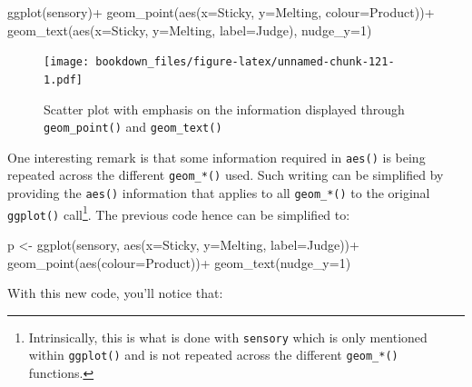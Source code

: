 \documentclass[
]{krantz}
\makeatletter
\newenvironment{Shaded}{\begin{snugshade}}{\end{snugshade}}
\newcommand{\AttributeTok}[1]{\textcolor[rgb]{0.61,0.61,0.61}{#1}}
\newcommand{\DecValTok}[1]{\textcolor[rgb]{0.06,0.06,0.06}{#1}}
\newcommand{\FunctionTok}[1]{\textcolor[rgb]{0,0,0}{#1}}
\newcommand{\NormalTok}[1]{#1}
\newcommand{\OtherTok}[1]{\textcolor[rgb]{0.37,0.37,0.37}{#1}}
\newcommand{\SpecialCharTok}[1]{\textcolor[rgb]{0,0,0}{#1}}
\newenvironment{kframe}{%
\medskip{}
\setlength{\fboxsep}{.8em}
 \def\at@end@of@kframe{}%
 \ifinner\ifhmode%
  \def\at@end@of@kframe{\end{minipage}}%
  \begin{minipage}{\columnwidth}%
 \fi\fi%
 \def\FrameCommand##1{\hskip\@totalleftmargin \hskip-\fboxsep
 \colorbox{shadecolor}{##1}\hskip-\fboxsep
     \hskip-\linewidth \hskip-\@totalleftmargin \hskip\columnwidth}%
 \MakeFramed {\advance\hsize-\width
   \@totalleftmargin\z@ \linewidth\hsize
   \@setminipage}}%
 {\par\unskip\endMakeFramed%
 \at@end@of@kframe}
\renewenvironment{Shaded}{\begin{kframe}}{\end{kframe}}
\makeatother
\begin{document}
\begin{Shaded}
\begin{Highlighting}[]
\FunctionTok{ggplot}\NormalTok{(sensory)}\SpecialCharTok{+}
  \FunctionTok{geom\_point}\NormalTok{(}\FunctionTok{aes}\NormalTok{(}\AttributeTok{x=}\NormalTok{Sticky, }\AttributeTok{y=}\NormalTok{Melting, }\AttributeTok{colour=}\NormalTok{Product))}\SpecialCharTok{+}
  \FunctionTok{geom\_text}\NormalTok{(}\FunctionTok{aes}\NormalTok{(}\AttributeTok{x=}\NormalTok{Sticky, }\AttributeTok{y=}\NormalTok{Melting, }\AttributeTok{label=}\NormalTok{Judge), }\AttributeTok{nudge\_y=}\DecValTok{1}\NormalTok{)}
\end{Highlighting}
\end{Shaded}

\begin{figure}
\centering
\texttt{[image: bookdown\_files/figure-latex/unnamed-chunk-121-1.pdf]}
\caption{\label{fig:unnamed-chunk-121}Scatter plot with emphasis on the information displayed through \texttt{geom\_point()} and \texttt{geom\_text()}}
\end{figure}

One interesting remark is that some information required in \texttt{aes()} is being repeated across the different \texttt{geom\_*()} used. Such writing can be simplified by providing the \texttt{aes()} information that applies to all \texttt{geom\_*()} to the original \texttt{ggplot()} call\footnote{Intrinsically, this is what is done with \texttt{sensory} which is only mentioned within \texttt{ggplot()} and is not repeated across the different \texttt{geom\_*()} functions.}. The previous code hence can be simplified to:

\begin{Shaded}
\begin{Highlighting}[]
\NormalTok{p }\OtherTok{\textless{}{-}} \FunctionTok{ggplot}\NormalTok{(sensory, }\FunctionTok{aes}\NormalTok{(}\AttributeTok{x=}\NormalTok{Sticky, }\AttributeTok{y=}\NormalTok{Melting, }\AttributeTok{label=}\NormalTok{Judge))}\SpecialCharTok{+}
  \FunctionTok{geom\_point}\NormalTok{(}\FunctionTok{aes}\NormalTok{(}\AttributeTok{colour=}\NormalTok{Product))}\SpecialCharTok{+}
  \FunctionTok{geom\_text}\NormalTok{(}\AttributeTok{nudge\_y=}\DecValTok{1}\NormalTok{)}
\end{Highlighting}
\end{Shaded}

With this new code, you'll notice that:
\end{document}
